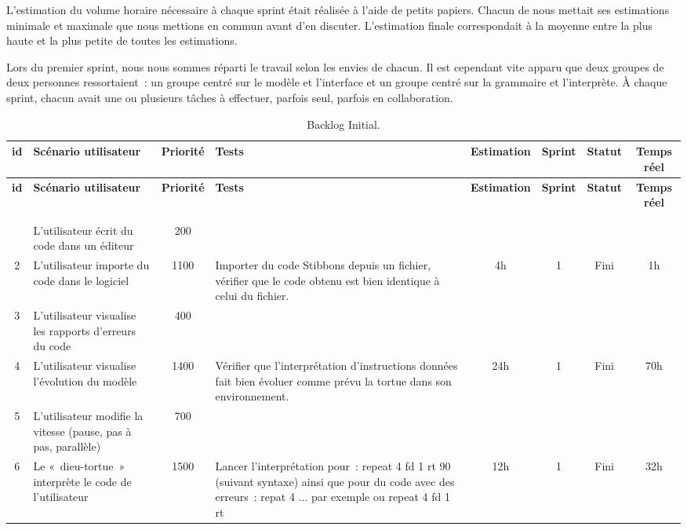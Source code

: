 L'estimation du volume horaire nécessaire à chaque sprint était réalisée à l'aide de petits papiers. Chacun de nous mettait ses estimations minimale et maximale que nous mettions en commun avant d'en discuter. L'estimation finale correspondait à la moyenne entre la plus haute et la plus petite de toutes les estimations. 

Lors du premier sprint, nous nous sommes réparti le travail selon les envies de chacun. Il est cependant vite apparu que deux groupes de deux personnes ressortaient~: un groupe centré sur le modèle et l'interface et un groupe centré sur la grammaire et l'interprète. 
À chaque sprint, chacun avait une ou plusieurs tâches à effectuer, parfois seul, parfois en collaboration.

{\tiny
\begin{longtable}[c]{|c|p{2cm}|c|p{4cm}|*{4}{c|}}
\hline
\bf id & \bf Scénario utilisateur & \bf Priorité & \bf Tests & \bf Estimation & \bf Sprint & \bf Statut & \bf Temps réel \\
\hline
\endfirsthead
\hline
\bf id & \bf Scénario utilisateur & \bf Priorité & \bf Tests & \bf Estimation & \bf Sprint & \bf Statut & \bf Temps réel \\
\hline
\endhead
\hline
\caption{Backlog Initial.} \label{bsp1}\\
\endlastfoot
\hline
\caption[]{Backlog Initial.}\\
\endfoot
1 & L'utilisateur écrit du code dans un éditeur & 200 &  &  &  &  &  \\
\hline
2 & L'utilisateur importe du code dans le logiciel & 1100 & Importer du code Stibbons depuis un fichier, vérifier que le code obtenu est bien identique à celui du fichier. & 4h & 1 & Fini & 1h \\
\hline
3 & L'utilisateur visualise les rapports d'erreurs du code & 400 &  &  &  &  &  \\
\hline
4 & L'utilisateur visualise l'évolution du modèle & 1400 & Vérifier que l'interprétation d'instructions données fait bien évoluer comme prévu la tortue dans son environnement. & 24h & 1 & Fini & 70h \\
\hline
5 & L'utilisateur modifie la vitesse (pause, pas à pas, parallèle) & 700 &  &  &  &  &  \\
\hline
6 & Le «~dieu-tortue~» interprète le code de l'utilisateur & 1500 & Lancer l'interprétation pour~: repeat 4 { fd 1 rt 90 } (suivant syntaxe) ainsi que pour du code avec des erreurs~: repat 4 {...} par exemple ou repeat 4 { fd 1 rt } & 12h & 1 & Fini & 32h \\

\end{longtable}}
